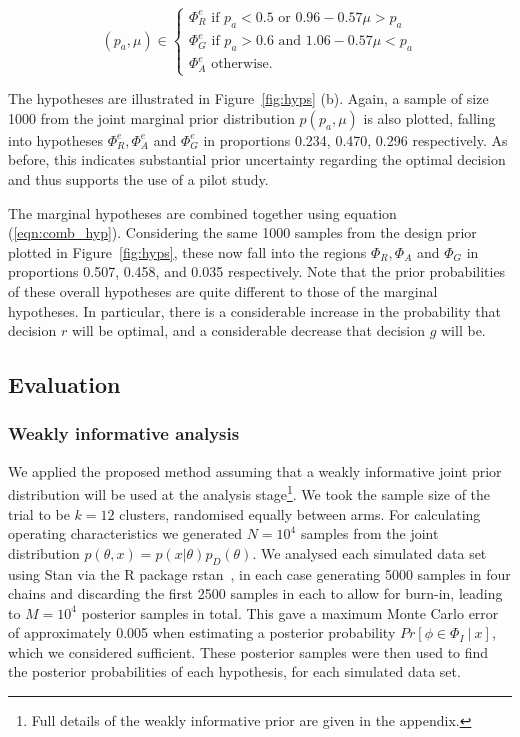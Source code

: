 \documentclass[AMA,STIX1COL]{WileyNJD-v2}
\begin{document}
\begin{equation}
  (p_{a}, \mu) \in \begin{cases}
               \Phi^e_R \text{ if } p_{a} < 0.5 \text{ or } 0.96-0.57\mu > p_{a} \\
               \Phi^e_G \text{ if } p_{a} > 0.6 \text{ and } 1.06-0.57\mu < p_{a} \\
               \Phi^e_A \text{ otherwise.}
            \end{cases}
\end{equation}

The hypotheses are illustrated in Figure~\ref{fig:hyps} (b). Again, a sample of size 1000 from the joint marginal prior distribution $p(p_{a}, \mu)$ is also plotted, falling into hypotheses $\Phi^e_R, \Phi^e_A$ and $\Phi^e_G$ in proportions 0.234, 0.470, 0.296 respectively. As before, this indicates substantial prior uncertainty regarding the optimal decision and thus supports the use of a pilot study.

The marginal hypotheses are combined together using equation (\ref{eqn:comb_hyp}). Considering the same 1000 samples from the design prior plotted in Figure~\ref{fig:hyps}, these now fall into the regions $\Phi_R, \Phi_A$ and $\Phi_G$ in proportions 0.507, 0.458, and 0.035 respectively. Note that the prior probabilities of these overall hypotheses are quite different to those of the marginal hypotheses. In particular, there is a considerable increase in the probability that decision $r$ will be optimal, and a considerable decrease that decision $g$ will be. 
\subsection{Evaluation}

\subsubsection{Weakly informative analysis}

We applied the proposed method assuming that a weakly informative joint prior distribution will be used at the analysis stage\footnote{Full details of the weakly informative prior are given in the appendix.}. We took the sample size of the trial to be $k = 12$ clusters, randomised equally between arms. For calculating operating characteristics we generated $N = 10^4$ samples from the joint distribution $p(\theta, x) = p(x | \theta)p_D(\theta)$. We analysed each simulated data set using Stan via the R package rstan~\cite{rstan}, in each case generating 5000 samples in four chains and discarding the first 2500 samples in each to allow for burn-in, leading to $M = 10^4$ posterior samples in total. This gave a maximum Monte Carlo error of approximately 0.005 when estimating a posterior probability $Pr[\phi \in \Phi_I ~|~ x]$, which we considered sufficient. These posterior samples were then used to find the posterior probabilities of each hypothesis, for each simulated data set.
\end{document}

